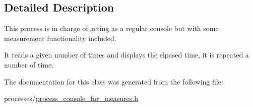 \subsection{Detailed Description}
This process is in charge of acting as a regular console but with some measurement functionality included. 

It reads a given number of times and displays the elpased time, it is repeated a number of time. 

The documentation for this class was generated from the following file\-:\begin{DoxyCompactItemize}
\item 
processes/\hyperlink{process__console__for__measures_8h}{process\-\_\-console\-\_\-for\-\_\-measures.\-h}\end{DoxyCompactItemize}
